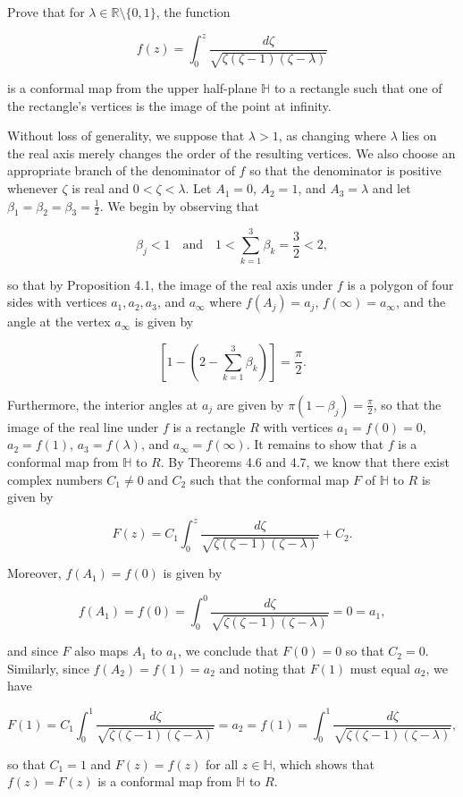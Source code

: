 Prove that for $\lambda \in \mathbb{R} \setminus \{0, 1\}$, the function

$$
f(z) = \int_0^z \frac{d\zeta}{\sqrt{\zeta (\zeta - 1)(\zeta - \lambda)}}
$$

is a conformal map from the upper half-plane $\mathbb{H}$ to a rectangle such that one of the rectangle's vertices is 
the image of the point at infinity.

\begin{solution} 
  Without loss of generality, we suppose that $\lambda > 1$, as changing where $\lambda$ lies on the real axis merely 
  changes the order of the resulting vertices. We also choose an appropriate branch of the denominator of $f$ so that 
  the denominator is positive whenever $\zeta$ is real and $0 < \zeta < \lambda$. Let $A_1 = 0$, $A_2 = 1$, and 
  $A_3 = \lambda$ and let $\beta_1 = \beta_2 = \beta_3 = \frac{1}{2}$. We begin by observing that 

  $$
  \beta_j < 1 \quad \text{and} \quad 1 < \sum_{k=1}^{3} \beta_k = \frac{3}{2} < 2,
  $$

  so that by Proposition 4.1, the image of the real axis under $f$ is a polygon of four sides with vertices 
  $a_1, a_2, a_3$, and $a_{\infty}$ where $f(A_j) = a_j$, $f(\infty) = a_{\infty}$, and the angle at the vertex 
  $a_{\infty}$ is given by 
  
  $$
    \left[1 - \left(2 - \sum\limits_{k = 1}^3 \beta_k \right) \right] = \frac{\pi}{2}.
  $$

  Furthermore, the interior angles at $a_j$ are given by $\pi (1 - \beta_j) = \frac{\pi}{2}$, so that the image of the 
  real line under $f$ is a rectangle $R$ with vertices $a_1 = f(0) = 0$, $a_2 = f(1)$, $a_3 = f(\lambda)$, and 
  $a_{\infty} = f(\infty)$. It remains to show that $f$ is a conformal map from $\mathbb{H}$ to $R$. By Theorems 4.6 and 
  4.7, we know that there exist complex numbers $C_1 \neq 0$ and $C_2$ such that the conformal map $F$ of $\mathbb{H}$ 
  to $R$ is given by

  $$
  F(z) = C_1 \int_0^z \frac{d\zeta}{\sqrt{\zeta(\zeta - 1)(\zeta - \lambda)}} + C_2.
  $$

  Moreover, $f(A_1) = f(0)$ is given by

  $$
  f(A_1) = f(0) = \int_0^0 \frac{d\zeta}{\sqrt{\zeta(\zeta - 1)(\zeta - \lambda)}} = 0 = a_1,
  $$

  and since $F$ also maps $A_1$ to $a_1$, we conclude that $F(0) = 0$ so that $C_2 = 0$. Similarly, since 
  $f(A_2) = f(1) = a_2$ and noting that $F(1)$ must equal $a_2$, we have

  $$
  F(1) = C_1 \int_0^1 \frac{d\zeta}{\sqrt{\zeta(\zeta - 1)(\zeta - \lambda)}} = a_2 = f(1) = \int_0^1 \frac{d\zeta}{\sqrt{\zeta(\zeta - 1)(\zeta - \lambda)}},  
  $$

  so that $C_1 = 1$ and $F(z) = f(z)$ for all $z \in \mathbb{H}$, which shows that $f(z) = F(z)$ is a conformal map
  from $\mathbb{H}$ to $R$.
  \ \\
\end{solution}